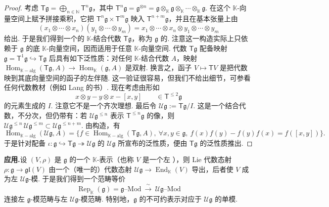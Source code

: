 \begin{proof}
考虑 $\mathsf T\mathfrak g=\bigoplus_{n\in\mathbb N}\mathsf T^n\mathfrak g$，其中 $\mathsf T^n\mathfrak g=\mathfrak g^{\otimes n}=\mathfrak g\otimes_{\mathbb K}\mathfrak g\otimes_{\mathbb K}\cdots\otimes_{\mathbb K}\mathfrak g$. 在这个 $\mathbb K$-向量空间上赋予拼接乘积，它把 $\mathsf T^n\mathfrak g\times\mathsf T^m\mathfrak g$ 映入 $\mathsf T^{n+m}\mathfrak g$，并且在基本张量上由
\[
(x_1\otimes\cdots\otimes x_n)(y_1\otimes\cdots\otimes y_m)=x_1\otimes\cdots\otimes x_n\otimes y_1\otimes\cdots\otimes y_m
\]
给出. 于是我们得到一个的 $\mathbb K$-结合代数 $\mathsf T\mathfrak g$，称为 $\mathfrak g$ 的.
注意这一构造实际上只依赖于 $\mathfrak g$ 的底 $\mathbb K$-向量空间，因而适用于任意 $\mathbb K$-向量空间. 代数 $\mathsf T\mathfrak g$ 配备映射 $\mathfrak g=\mathsf T^1\mathfrak g\hookrightarrow\mathsf T\mathfrak g$ 后具有如下泛性质：对任何 $\mathbb K$-结合代数 $A$，映射 $\operatorname{Hom}_{\mathbb K-\mathrm{alg}}(\mathsf T\mathfrak g,A)\longrightarrow\operatorname{Hom}_{\mathbb K}(\mathfrak g,A)$ 是双射. 换言之，函子 $V\mapsto\mathsf TV$ 是把代数映到其底向量空间的函子的左伴随. 这一验证很容易，但我们不给出细节，可参看任何代数教材（例如 Lang 的书）.
现在考虑由形如
\[
x\otimes y-y\otimes x-[x,y]\qquad\in\mathsf T^{\le 2}\mathfrak g
\]
的元素生成的 $I$. 注意它不是一个齐次理想. 最后令 $\mathcal U\mathfrak g:=\mathsf T\mathfrak g/I$. 这是一个结合代数，不分次，但仍带有：若 $\mathcal U\mathfrak g^{\le n}$ 表示 $\mathsf T^{\le n}\mathfrak g$ 的像，则 $\mathcal U\mathfrak g^{\le n}\,\mathcal U\mathfrak g^{\le m}\subset\mathcal U\mathfrak g^{\le n+m}$. 由构造，有
\[
\operatorname{Hom}_{\mathbb K-\mathrm{alg}}(\mathcal U\mathfrak g,A)=\{f\in\operatorname{Hom}_{\mathbb K-\mathrm{alg}}(\mathsf T\mathfrak g,A),\ \forall x,y\in\mathfrak g,\ f(x)f(y)-f(y)f(x)=f([x,y])\}.
\]
于是针对配备 $\iota:\mathfrak g\hookrightarrow\mathsf T\mathfrak g\twoheadrightarrow\mathcal U\mathfrak g$ 的 $\mathcal U\mathfrak g$ 所宣布的泛性质，便由 $\mathsf T\mathfrak g$ 的泛性质推出.
\end{proof}

\noindent\textbf{应用.}\quad 设 $(V,\rho)$ 是 $\mathfrak g$ 的一个 $\mathbb K$-表示（也称 $V$ 是一个左 ），则 Lie 代数态射 $\rho:\mathfrak g\longrightarrow\mathfrak{gl}(V)$ 由一个（唯一的）代数态射 $\mathcal U\mathfrak g\longrightarrow\operatorname{End}_{\mathbb K}(V)$ 导出，后者使 $V$ 成为左 $\mathcal U\mathfrak g$-模. 于是我们得到一个范畴等价
\[
\operatorname{Rep}_{\mathbb K}(\mathfrak g)=\mathfrak g\text{--Mod}\ \xrightarrow{\ \sim\ }\ \mathcal U\mathfrak g\text{--Mod}
\]
连接左 $\mathfrak g$-模范畴与左 $\mathcal U\mathfrak g$-模范畴. 特别地，$\mathfrak g$ 的不可约表示对应于 $\mathcal U\mathfrak g$ 的单模.

